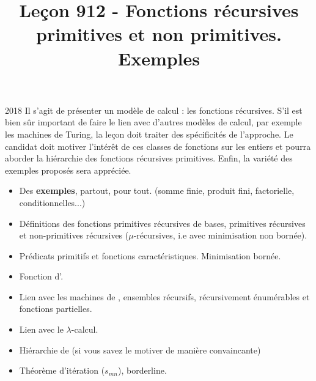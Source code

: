 \documentclass{agregfiche}
\title{Leçon 912 - Fonctions récursives primitives et non primitives. Exemples}
\begin{document}
\maketitle

\secrapports
\begin{rapport}{2018}
	Il s’agit de présenter un modèle de calcul : les fonctions récursives. S’il est bien sûr important de faire
	le lien avec d’autres modèles de calcul, par exemple les machines de Turing, la leçon doit traiter des
	spécificités de l’approche. Le candidat doit motiver l’intérêt de ces classes de fonctions sur les entiers et
	pourra aborder la hiérarchie des fonctions récursives primitives. Enfin, la variété des exemples proposés
	sera appréciée.
\end{rapport}

\secindispensables

\begin{itemize}
	\item Des \textbf{exemples}, partout, pour tout. (somme finie, produit fini, factorielle, conditionnelles...) 
	\item Définitions des fonctions primitives récursives de bases, primitives récursives et non-primitives récursives ($\mu$-récursives, i.e avec minimisation non bornée).
	\item Prédicats primitifs et fonctions caractéristiques. Minimisation bornée.
  
\end{itemize}

\secasavoir

\begin{itemize}
	\item Fonction d'.
	\item Lien avec les machines de , ensembles récursifs, récursivement énumérables et fonctions partielles.
\end{itemize}


\secidees

\begin{itemize}
	\item Lien avec le $\lambda$-calcul.
	\item Hiérarchie de  (si vous savez le motiver de manière convaincante)
	\item Théorème d'itération ($s_{mn}$), borderline.
\end{itemize}

\secpieges
\end{document}
